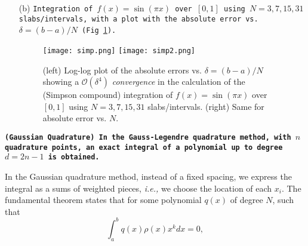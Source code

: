 \documentclass[11pt]{article}
\newcounter{question}[section]
\newcommand{\question}[2] {\vspace{.25in} \fbox{#1} #2 \vspace{.10in}}
\newcommand{\ie}{{\it i.e., }}
\begin{document}
\begin{enumerate}
\quad

\item[(b)] {\color{MidnightBlue}\texttt{Integration of $f(x)=\sin(\pi x)$ over $[0,1]$ using $N=3,7,15,31$ slabs/intervals, with a plot with the absolute error vs. $\delta=(b-a)/N$ (Fig \ref{innn}).}}

\quad

\begin{figure} [ht]
\begin{center}
\texttt{[image: simp.png]} 
\texttt{[image: simp2.png]} 
\caption{(left) Log-log plot of the absolute errors  vs. $\delta=(b-a)/N$ showing a $\mathcal{O}(\delta^4)$ {\it convergence} in the calculation of the (Simpson compound) integration of  $f(x)=\sin(\pi x)$ over $[0,1]$ using $N=3,7,15,31$ slabs/intervals. (right) Same for absolute error vs. $N$. }
\label{innn}
\end{center}
\end{figure}

\quad

\end{enumerate}

\clearpage



{\color{MidnightBlue}
\question{Q.4}{\texttt{{\bf(Gaussian Quadrature)} {\bf In the Gauss-Legendre quadrature method, with $n$ quadrature points, an exact integral of a polynomial up to degree $d=2n-1$ is obtained. }}}}

{}

\quad


In the Gaussian quadrature method, instead of a fixed spacing, we express the integral as a sums of weighted pieces, \ie we choose the location of each $x_i$. The fundamental theorem states that for some polynomial $q(x)$ of degree $N$, such that
$$ \int_a^b q(x) \rho(x) x^k dx = 0,$$
\end{document}
